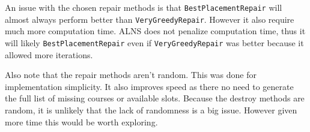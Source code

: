 An issue with the chosen repair methods is that \texttt{BestPlacementRepair} will almost always perform better than \texttt{VeryGreedyRepair}. However it also require much more computation time. ALNS does not penalize computation time, thus it will likely  \texttt{BestPlacementRepair} even if \texttt{VeryGreedyRepair} was better because it allowed more iterations.

Also note that the repair methods aren't random. This was done for implementation simplicity. It also improves speed as there no need to generate the full list of missing courses or available slots. Because the destroy methods are random, it is unlikely that the lack of randomness is a big issue. However given more time this would be worth exploring.
